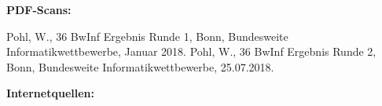 \documentclass[a4paper,12pt]{article}
\begin{document}
\vspace{1cm}

\begin{large}
\textbf{PDF-Scans:}
\end{large}

\makeatletter
\apptocmd{\thebibliography}{\global\c@NAT@ctr 2\relax}{}{}
\makeatother

\begin{thebibliography}{9}


      Pohl, W.,
      36 BwInf Ergebnis Runde 1,
      Bonn, Bundesweite Informatikwettbewerbe,
      Januar 2018.
      Pohl, W.,
      36 BwInf Ergebnis Runde 2,
      Bonn, Bundesweite Informatikwettbewerbe,
      25.07.2018.

\end{thebibliography}

\vspace{1cm}

\begin{large}
\textbf{Internetquellen:}
\end{large}

\makeatletter
\apptocmd{\thebibliography}{\global\c@NAT@ctr 4\relax}{}{}
\makeatother
\end{document}
